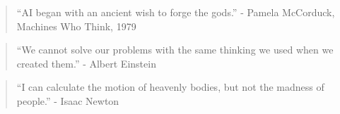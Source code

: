 \begin{quote}
``AI began with an ancient wish to forge the gods.'' - Pamela McCorduck, Machines Who Think, 1979
\end{quote}

\begin{quote}
``We cannot solve our problems with the same thinking we used when we created them.'' - Albert Einstein
\end{quote}

\begin{quote}
	``I can calculate the motion of heavenly bodies, but not the madness of people.'' - Isaac Newton
\end{quote}

